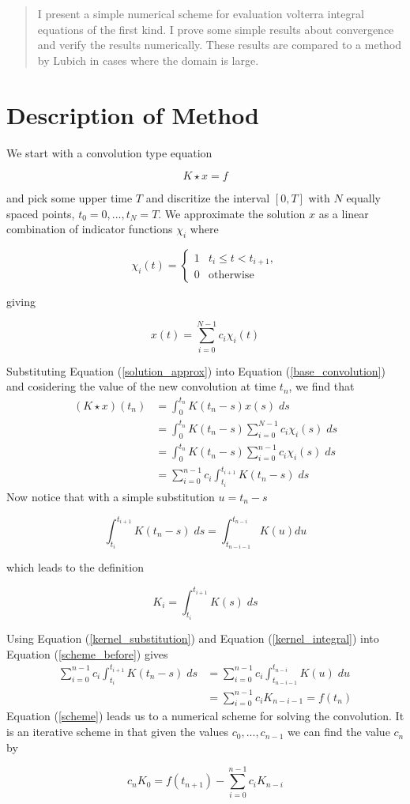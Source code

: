 \documentclass[11pt]{article}
\numberwithin{equation}{section}
\newcommand{\eqn}[2]{
	\begin{equation}
		\label{#1}
		#2
	\end{equation}
}
\newcommand{\eqr}[1]{Equation (\ref{#1})}
\begin{document}
\maketitle
\begin{abstract}
I present a simple numerical scheme for evaluation volterra integral
equations of the first kind. I prove some simple results about
convergence and verify the results numerically. These results are
compared to a method by Lubich in cases where the domain is large.
\end{abstract}
\setcounter{tocdepth}{1}
\tableofcontents
\lstlistoflistings
\listoftables
\section{Description of Method}
We start with a convolution type equation
\eqn{base_convolution}{
	K \star x = f
}
and pick some upper time $T$ and discritize the interval $[0, T]$ with $N$
equally spaced points, $t_0 = 0, ..., t_N = T$. We approximate the solution $x$
as a linear combination of indicator functions $\chi_i$ where
\eqn{indicator_defn}{
	\chi_i(t)
	=
	\left\{
	\begin{array}{ll}
		1 &
		t_{i} \leq t < t_{i+1} ,
		\\
		0 &
		\text{otherwise}
	\end{array}
	\right.
}
giving
\eqn{solution_approx}{
	x(t) = \sum_{i=0}^{N-1} c_i \chi_i(t)
}
Substituting \eqr{solution_approx} into \eqr{base_convolution} and cosidering
the value of the new convolution at time $t_n$, we find that
\begin{align}
\nonumber            	(K \star x)(t_n)
                     		&= \int_0^{t_n} K(t_n - s)x(s)\; ds \\
\nonumber            		&= \int_0^{t_n} K(t_n - s) \sum_{i=0}^{N-1} c_i \chi_i(s)\; ds \\
\nonumber            		&= \int_0^{t_n} K(t_n - s) \sum_{i=0}^{n-1} c_i \chi_i(s)\; ds \\
\label{scheme_before}		&= \sum_{i=0}^{n-1} c_i \int_{t_i}^{t_{i+1}} K(t_n - s)\; ds
\end{align}
Now notice that with a simple substitution $u = t_n - s$
\eqn{kernel_substitution}{
	\int_{t_i}^{t_{i+1}}K(t_n - s)\; ds = \int_{t_{n-i-1}}^{t_{n-i}} K(u) du
}
which leads to the definition
\eqn{kernel_integral}{
	K_i = \int_{t_i}^{t_{i+1}} K(s)\; ds
}
Using \eqr{kernel_substitution} and \eqr{kernel_integral} into \eqr{scheme_before}
gives
\begin{align}
\nonumber     	\sum_{i=0}^{n-1} c_i \int_{t_i}^{t_{i+1}} K(t_n - s)\; ds
              		&= \sum_{i=0}^{n-1} c_i \int_{t_{n-i-1}}^{t_{n-i}} K(u)\; du\\
\label{scheme}		&= \sum_{i=0}^{n-1} c_i K_{n-i-1} = f(t_n)
\end{align}
\eqr{scheme} leads us to a numerical scheme for solving the convolution. It is
an iterative scheme in that given the values $c_0, ..., c_{n-1}$ we can find
the value $c_n$ by
\eqn{specific_term}{
	c_nK_0 = f(t_{n+1}) - \sum_{i=0}^{n-1} c_i K_{n-i}
}
\end{document}
